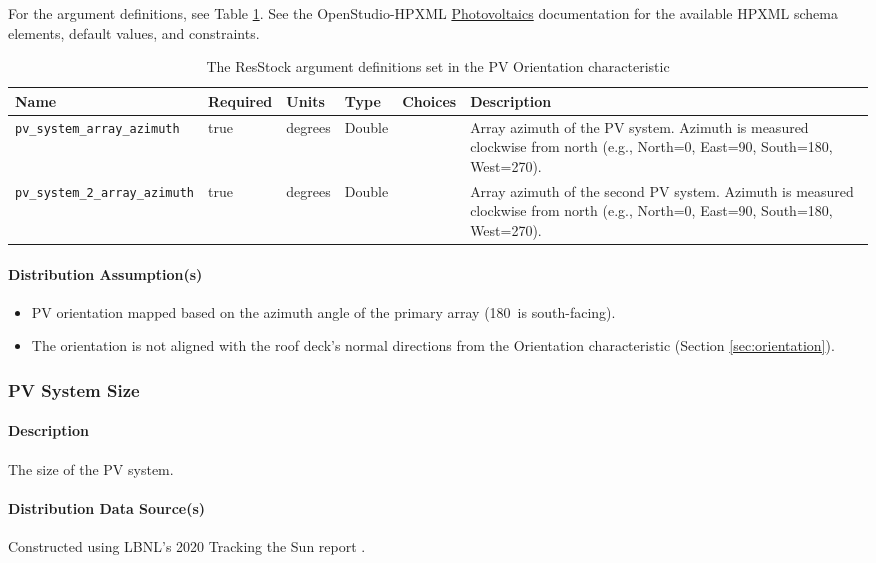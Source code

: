 For the argument definitions, see Table \ref{table:hc_arg_def_pv_orient}. See the OpenStudio-HPXML \href{https://openstudio-hpxml.readthedocs.io/en/v1.8.1/workflow_inputs.html#hpxml-photovoltaics}{Photovoltaics} documentation for the available HPXML schema elements, default values, and constraints.

\begin{longtable}[]{|p{}|p{1.5cm}|p{1.5cm}|p{1.1cm}|p{2.4cm}|p{4.5cm}|}
\caption{The ResStock argument definitions set in the PV Orientation characteristic} \label{table:hc_arg_def_pv_orient} \\
\toprule\noalign{}
Name & Required & Units & Type & Choices & Description \\
\midrule\noalign{}
\endhead
\bottomrule\noalign{}
\endlastfoot
\texttt{pv\_system\_array\_azimuth} & true & degrees & Double & & Array
azimuth of the PV system. Azimuth is measured clockwise from north
(e.g., North=0, East=90, South=180, West=270). \\
\texttt{pv\_system\_2\_array\_azimuth} & true & degrees & Double & &
Array azimuth of the second PV system. Azimuth is measured clockwise
from north (e.g., North=0, East=90, South=180, West=270). \\
\end{longtable}

\paragraph{Distribution Assumption(s)}
\begin{itemize}
    \item PV orientation mapped based on the azimuth angle of the primary array (180\degree~is south-facing).
    \item The orientation is not aligned with the roof deck's normal directions from the Orientation characteristic (Section \ref{sec:orientation}).
\end{itemize}

\subsubsection{PV System Size} \label{sec:pv_system_size}
\paragraph{Description}
The size of the PV system.

\paragraph{Distribution Data Source(s)}
Constructed using LBNL's 2020 Tracking the Sun report \citep{LBNLTTS2019}.

